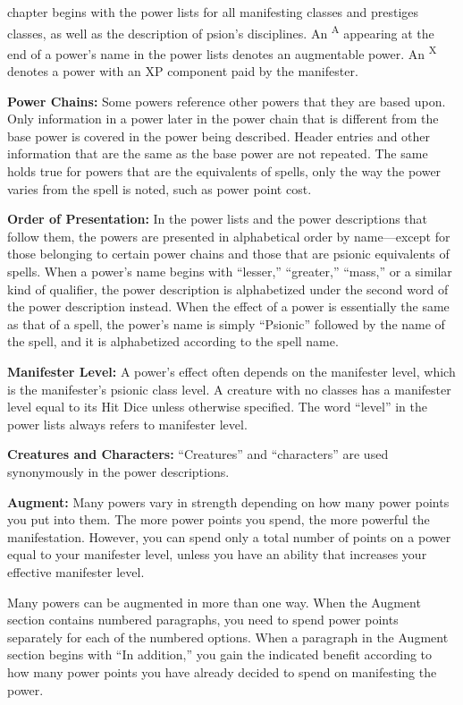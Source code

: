 {}{}

 chapter begins with the power lists for all manifesting classes and prestiges classes, as well as the description of psion's disciplines. An \textsuperscript{A} appearing at the end of a power's name in the power lists denotes an augmentable power. An \textsuperscript{X} denotes a power with an XP component paid by the manifester.

\textbf{Power Chains:} Some powers reference other powers that they are based upon. Only information in a power later in the power chain that is different from the base power is covered in the power being described. Header entries and other information that are the same as the base power are not repeated. The same holds true for powers that are the equivalents of spells, only the way the power varies from the spell is noted, such as power point cost.

\textbf{Order of Presentation:} In the power lists and the power descriptions that follow them, the powers are presented in alphabetical order by name---except for those belonging to certain power chains and those that are psionic equivalents of spells. When a power's name begins with ``lesser,'' ``greater,'' ``mass,'' or a similar kind of qualifier, the power description is alphabetized under the second word of the power description instead. When the effect of a power is essentially the same as that of a spell, the power's name is simply ``Psionic'' followed by the name of the spell, and it is alphabetized according to the spell name.

\textbf{Manifester Level:} A power's effect often depends on the manifester level, which is the manifester's psionic class level. A creature with no classes has a manifester level equal to its Hit Dice unless otherwise specified. The word ``level'' in the power lists always refers to manifester level.

\textbf{Creatures and Characters:} ``Creatures'' and ``characters'' are used synonymously in the power descriptions.

\textbf{Augment:} Many powers vary in strength depending on how many power points you put into them. The more power points you spend, the more powerful the manifestation. However, you can spend only a total number of points on a power equal to your manifester level, unless you have an ability that increases your effective manifester level.

Many powers can be augmented in more than one way. When the Augment section contains numbered paragraphs, you need to spend power points separately for each of the numbered options. When a paragraph in the Augment section begins with ``In addition,'' you gain the indicated benefit according to how many power points you have already decided to spend on manifesting the power.

